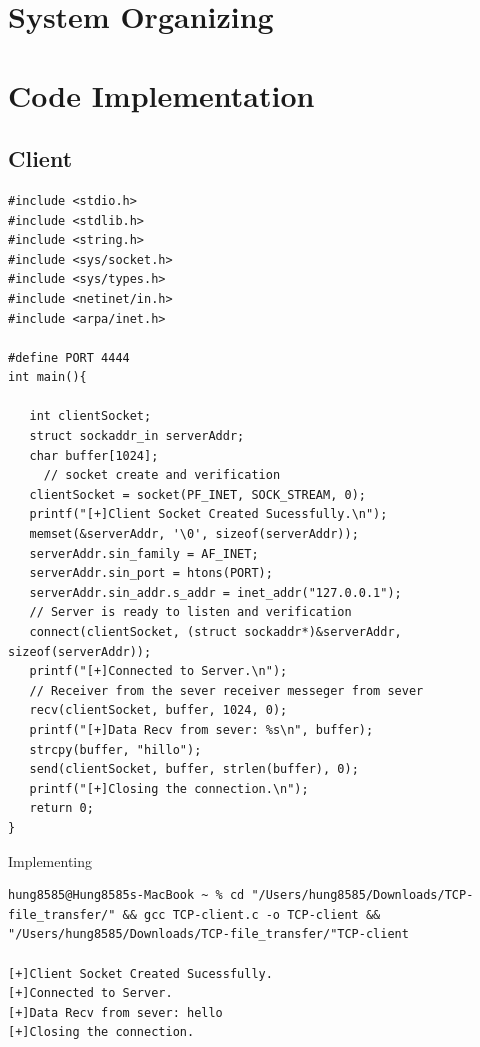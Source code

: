 \documentclass{article}
\begin{document}
\section{System Organizing}
\newpage
\section{Code Implementation}
\subsection{Client}
\begin{lstlisting}
#include <stdio.h>
#include <stdlib.h>
#include <string.h>
#include <sys/socket.h>
#include <sys/types.h>
#include <netinet/in.h>
#include <arpa/inet.h>
 
#define PORT 4444
int main(){
  
   int clientSocket;
   struct sockaddr_in serverAddr;
   char buffer[1024];
     // socket create and verification
   clientSocket = socket(PF_INET, SOCK_STREAM, 0);
   printf("[+]Client Socket Created Sucessfully.\n");
   memset(&serverAddr, '\0', sizeof(serverAddr));
   serverAddr.sin_family = AF_INET;
   serverAddr.sin_port = htons(PORT);
   serverAddr.sin_addr.s_addr = inet_addr("127.0.0.1");
   // Server is ready to listen and verification
   connect(clientSocket, (struct sockaddr*)&serverAddr, sizeof(serverAddr));
   printf("[+]Connected to Server.\n");
   // Receiver from the sever receiver messeger from sever
   recv(clientSocket, buffer, 1024, 0);
   printf("[+]Data Recv from sever: %s\n", buffer);
   strcpy(buffer, "hillo");
   send(clientSocket, buffer, strlen(buffer), 0);
   printf("[+]Closing the connection.\n");
   return 0;
}
\end{lstlisting}
Implementing
\begin{lstlisting}
hung8585@Hung8585s-MacBook ~ % cd "/Users/hung8585/Downloads/TCP-file_transfer/" && gcc TCP-client.c -o TCP-client && "/Users/hung8585/Downloads/TCP-file_transfer/"TCP-client

[+]Client Socket Created Sucessfully.
[+]Connected to Server.
[+]Data Recv from sever: hello
[+]Closing the connection.
\end{lstlisting}
\end{document}
